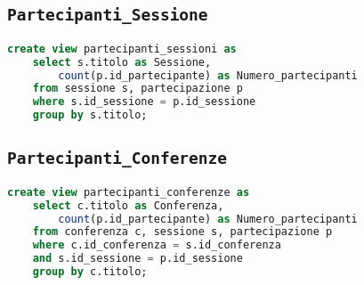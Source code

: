 \subsection{\texttt{Partecipanti\_Sessione}}
\begin{lstlisting}[language=SQL,style=mystyle]
	create view partecipanti_sessioni as
	select s.titolo as Sessione, 
		count(p.id_partecipante) as Numero_partecipanti
	from sessione s, partecipazione p 
	where s.id_sessione = p.id_sessione
	group by s.titolo;
\end{lstlisting}
\subsection{\texttt{Partecipanti\_Conferenze}}
\begin{lstlisting}[language=SQL,style=mystyle]
	create view partecipanti_conferenze as
	select c.titolo as Conferenza, 
		count(p.id_partecipante) as Numero_partecipanti
	from conferenza c, sessione s, partecipazione p
	where c.id_conferenza = s.id_conferenza 
	and s.id_sessione = p.id_sessione
	group by c.titolo;
	
\end{lstlisting}